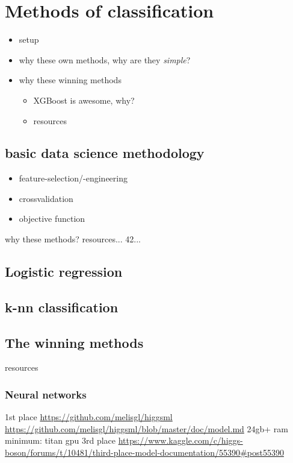 \section{Methods of classification}\label{ch:methods}\raggedbottom
\begin{itemize}
	\item setup
	\item why these own methods, why are they \textit{simple}?
	\item why these winning methods
	\begin{itemize}
		\item XGBoost is awesome, why?
		\item resources
	\end{itemize}
\end{itemize}


\subsection{basic data science methodology}
\begin{itemize}
	\item feature-selection/-engineering	
	\item crossvalidation
	\item objective function
\end{itemize}

why these methods? resources... 42...

\subsection{Logistic regression}


\subsection{k-nn classification}


\subsection{The winning methods}
resources

\subsubsection{Neural networks}
1st place
\url{https://github.com/melisgl/higgsml}
\url{https://github.com/melisgl/higgsml/blob/master/doc/model.md}
24gb+ ram
minimum: titan gpu
3rd place
\url{https://www.kaggle.com/c/higgs-boson/forums/t/10481/third-place-model-documentation/55390#post55390}

